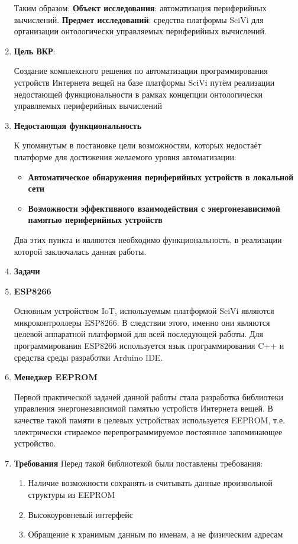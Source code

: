 \documentclass[14pt]{extarticle}
\begin{document}
\begin{enumerate}
	Таким образом:
	\textbf{Объект исследования}: автоматизация периферийных вычислений.
	\textbf{Предмет исследований}: средства платформы SciVi для организации онтологически управляемых периферийных вычислений.
	\item \textbf{Цель ВКР}:

	Создание комплексного решения по  автоматизации программирования устройств Интернета вещей на базе платформы SciVi путём реализации недостающей функциональности в рамках концепции онтологически управляемых периферийных вычислений
	\item \textbf{Недостающая функциональность}

	К упомянутым в постановке цели возможностям, которых недостаёт платформе для достижения желаемого уровня автоматизации:
	\begin{itemize}
		\item \textbf{Автоматическое обнаружения периферийных устройств в локальной сети}
		\item \textbf{Возможности эффективного взаимодействия с энергонезависимой памятью периферийных устройств}
	\end{itemize}
	Два этих пункта и являются необходимо функциональность, в реализации которой заключалась данная работы.
	\item \textbf{Задачи}

	\item \textbf{ESP8266}

	Основным устройством IoT, используемым платформой SciVi являются микроконтроллеры ESP8266.
	В следствии этого, именно они являются целевой аппаратной платформой для всей последующей работы.
	Для программирования ESP8266 используется язык программирования C++ и средства среды разработки Arduino IDE.
	\item \textbf{Менеджер EEPROM}

	Первой практической задачей данной работы стала разработка библиотеки управления энергонезависимой памятью устройств Интернета вещей.
	В качестве такой памяти в целевых устройствах используется EEPROM, т.е. электрически стираемое перепрограммируемое постоянное запоминающее устройство.

	\item \textbf{Требования}
	Перед такой библиотекой были поставлены требования:
	\begin{enumerate}
		\item Наличие возможности сохранять и считывать данные произвольной структуры из EEPROM
		\item Высокоуровневый интерфейс
		\item Обращение к хранимым данным по именам, а не физическим адресам
	\end{enumerate}


\end{enumerate}
\end{document}
